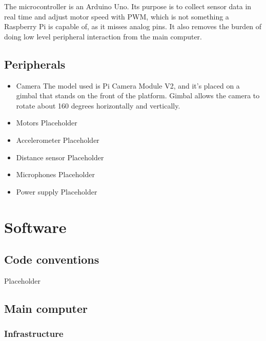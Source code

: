 \documentclass[11pt, a4paper]{article}
\begin{document}
    The microcontroller is an Arduino Uno. Its purpose is to collect sensor data in real time and adjust motor speed with PWM, which is not something a Raspberry Pi is capable of, as it misses analog pins. It also removes the burden of doing low level peripheral interaction from the main computer.
    
    \subsection{Peripherals}
    
    \begin{itemize}
        \item Camera\newline
        The model used is Pi Camera Module V2, and it's placed on a gimbal that stands on the front of the platform. Gimbal allows the camera to rotate about 160 degrees horizontally and vertically.
        \item Motors\newline
        Placeholder
        \item Accelerometer\newline
        Placeholder
        \item Distance sensor\newline
        Placeholder
        \item Microphones\newline
        Placeholder
        \item Power supply\newline
        Placeholder
    \end{itemize}

    \section{Software}
    
    \subsection{Code conventions}
    
    Placeholder
    
    \subsection{Main computer}
    
    \subsubsection{Infrastructure}
    
\end{document}
